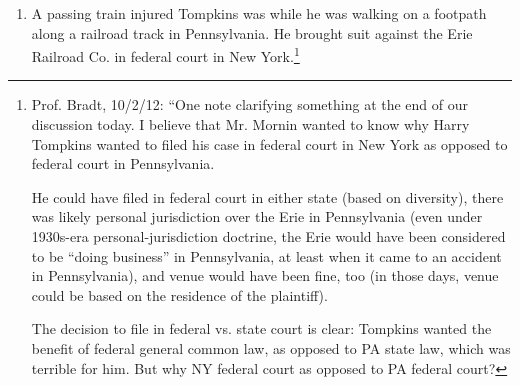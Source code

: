 \begin{enumerate}
    \item A passing train injured Tompkins was while he was walking on a 
    footpath along a railroad track in Pennsylvania. He brought suit against 
    the Erie Railroad Co. in federal court in New York.\footnote{Prof. Bradt, 
    10/2/12: ``One note clarifying something at the end of our discussion 
    today. I believe that Mr. Mornin wanted to know why Harry Tompkins wanted 
    to filed his case in federal court in New York as opposed to federal court 
    in Pennsylvania.

    He could have filed in federal court in either state (based on diversity), 
    there was likely personal jurisdiction over the Erie in Pennsylvania (even 
    under 1930s-era personal-jurisdiction doctrine, the Erie would have been 
    considered to be ``doing business'' in Pennsylvania, at least when it came 
    to an accident in Pennsylvania), and venue would have been fine, too (in 
    those days, venue could be based on the residence of the plaintiff).

    The decision to file in federal vs. state court is clear: Tompkins wanted 
    the benefit of federal general common law, as opposed to PA state law, 
    which was terrible for him. But why NY federal court as opposed to PA 
    federal court?

}
\end{enumerate}

